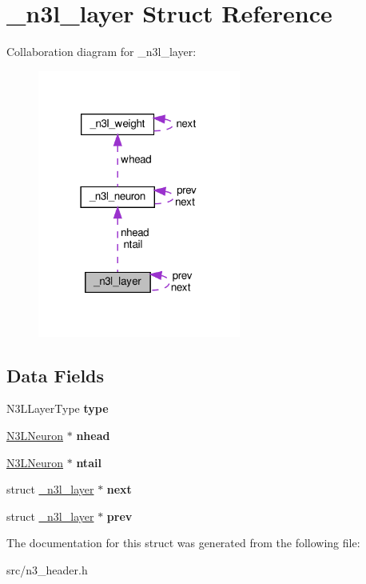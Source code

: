 \hypertarget{struct__n3l__layer}{}\section{\+\_\+n3l\+\_\+layer Struct Reference}
\label{struct__n3l__layer}


Collaboration diagram for \+\_\+n3l\+\_\+layer\+:\nopagebreak
\begin{figure}[H]
\begin{center}
\leavevmode
\includegraphics[width=189pt]{struct__n3l__layer__coll__graph}
\end{center}
\end{figure}
\subsection*{Data Fields}
\begin{DoxyCompactItemize}
\item 
\mbox{\label{struct__n3l__layer_aec180f7f12ea86bb622c364076dbf1f6}} 
N3\+L\+Layer\+Type {\bfseries type}
\item 
\mbox{\label{struct__n3l__layer_a263e7831428a3b535964412a1d802c4e}} 
\hyperlink{struct__n3l__neuron}{N3\+L\+Neuron} $\ast$ {\bfseries nhead}
\item 
\mbox{\label{struct__n3l__layer_aa120fe4ab0898e733b8d6940b467ebc3}} 
\hyperlink{struct__n3l__neuron}{N3\+L\+Neuron} $\ast$ {\bfseries ntail}
\item 
\mbox{\label{struct__n3l__layer_afada0fe8b2a403d5aeeb71b0ae7f8aae}} 
struct \hyperlink{struct__n3l__layer}{\+\_\+n3l\+\_\+layer} $\ast$ {\bfseries next}
\item 
\mbox{\label{struct__n3l__layer_aedfd507c2c60e3b64234b8cd8570e6c9}} 
struct \hyperlink{struct__n3l__layer}{\+\_\+n3l\+\_\+layer} $\ast$ {\bfseries prev}
\end{DoxyCompactItemize}


The documentation for this struct was generated from the following file\+:\begin{DoxyCompactItemize}
\item 
src/n3\+\_\+header.\+h\end{DoxyCompactItemize}
